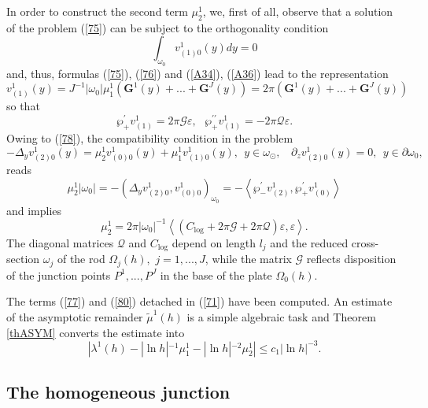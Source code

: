 \documentclass[11pt]{article}%
\numberwithin{equation}{section}
\begin{document}
In order to construct the second term $\mu_{2}^{1}$, we, first of all, observe
that a solution of the problem (\ref{75}) can be subject to the orthogonality
condition%
\begin{equation}
\int_{\omega_{0}}v_{(1)0}^{1}(y)dy=0 \label{78}%
\end{equation}
and, thus, formulas (\ref{75}), (\ref{76}) and (\ref{A34}), (\ref{A36}) lead
to the representation%
\[
v_{(1)}^{1}(y)=J^{-1}|\omega_{0}|\mu_{1}^{1}(\mathbf{G}^{1}(y)+...+\mathbf{G}%
^{J}(y))=2\pi(\mathbf{G}^{1}(y)+...+\mathbf{G}^{J}(y))
\]
so that%
\begin{equation}
\wp_{+}^{\prime}v_{(1)}^{1}=2\pi\mathcal{G}\varepsilon,\ \ \ \wp_{+}%
^{\prime\prime}v_{(1)}^{1}=-2\pi\mathcal{Q}\varepsilon. \label{79}%
\end{equation}
Owing to (\ref{78}), the compatibility condition in the problem%
\[
-\Delta_{y}v_{(2)0}^{1}(y)=\mu_{2}^{1}v_{(0)0}^{1}(y)+\mu_{1}^{1}v_{(1)0}%
^{1}(y),\ \ y\in\omega_{\odot},\ \ \ \ \partial_{z}v_{(2)0}^{1}(y)=0,\ \ y\in
\partial\omega_{0},
\]
reads%
\[
\mu_{2}^{1}|\omega_{0}|=-(\Delta_{y}v_{(2)0}^{1},v_{(0)0}^{1})_{\omega_{0}%
}=-\left\langle \wp_{-}^{\prime}v_{(2)}^{1},\wp_{+}^{\prime}v_{(0)}%
^{1}\right\rangle
\]
and implies%
\begin{equation}
\mu_{2}^{1}=2\pi|\omega_{0}|^{-1}\left\langle (C_{\log}+2\pi\mathcal{G+}%
2\pi\mathcal{Q})\varepsilon,\varepsilon\right\rangle . \label{80}%
\end{equation}
The diagonal matrices $\mathcal{Q}$ and $C_{\log}$ depend on length $l_{j}$
and the reduced cross-section $\omega_{j}$ of the rod $\Omega_{j}(h),$
$j=1,...,J$, while the matrix $\mathcal{G}$ reflects disposition of the
junction points $P^{1},...,P^{J}$ in the base of the plate $\Omega_{0}(h)$.

The terms (\ref{77}) and (\ref{80}) detached in (\ref{71}) have been computed.
An estimate of the asymptotic remainder $\widetilde{\mu}^{1}(h)$ is a simple
algebraic task and Theorem \ref{thASYM} converts the estimate into%
\begin{equation}
|\lambda^{1}(h)-|\ln h|^{-1}\mu_{1}^{1}-|\ln h|^{-2}\mu_{2}^{1}|\leq c_{1}|\ln
h|^{-3}. \label{81}%
\end{equation}


\subsection{The homogeneous junction\label{sect5.2}}
\end{document}

